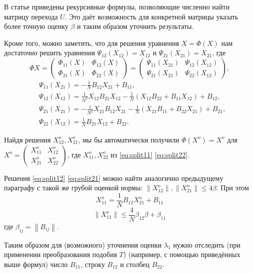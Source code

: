 В статье приведены рекурсивные формулы, позволяющие численно найти матрицу перехода \( U \).
Это даёт возможность для конкретной матрицы указать более точную оценку \( \beta \) и таким образом уточнить результаты.

Кроме того, можно заметить, что для решения уравнения \( X = \Phi(X) \)
нам достаточно решить уравнения \( \Psi_{12}(X_{12}) = X_{12} \) и \( \Psi_{21}(X_{21}) = X_{21} \),
где
\[
    \Phi X =
    \begin{pmatrix}
        \Phi_{11}(X) & \Phi_{12}(X) \\
        \Phi_{21}(X) & \Phi_{22}(X)
    \end{pmatrix} =
    \begin{pmatrix}
        \Psi_{11}(X_{21}) & \Psi_{12}(X_{12}) \\
        \Psi_{21}(X_{21}) & \Psi_{22}(X_{12})
    \end{pmatrix},
\]
\begin{subequations}
    \begin{align}
        \label{eq:split11}
        & \Psi_{11}(X_{21}) = -\frac1N B_{12}X_{21} + B_{11}, \\
        \label{eq:split12}
        & \Psi_{12}(X_{12}) = \frac{1}{N^2} X_{12}B_{21}X_{12} -
                                   \frac1N\left(X_{12}B_{22} +
                                   B_{11}X_{12}\right) + B_{12}, \\
        \label{eq:split21}
        & \Psi_{21}(X_{21}) = -\frac{1}{N^2} X_{21}B_{12}X_{21} -
                                   \frac1N\left(X_{21}B_{11} +
                                   B_{22}X_{21}\right) +
                                   B_{21}, \\
        \label{eq:split22}
        & \Psi_{22}(X_{12}) = \frac1N B_{21}X_{12} + B_{22}.
    \end{align}
\end{subequations}

Найдя решения \( X_{12}^o, X_{21}^o \),
мы бы автоматически получили
\( \Phi(X^o) = X^o \) для
\( X^o =
\left(\begin{smallmatrix}
    X_{11}^o & X_{12}^o \\
    X_{21}^o & X_{22}^o
\end{smallmatrix}\right) \),
где \( X_{11}^o, X_{22}^o \) из \eqref{eq:split11} \eqref{eq:split22}.

Решения \eqref{eq:split12} \eqref{eq:split21} можно найти аналогично предыдущему параграфу
с такой же грубой оценкой нормы: \( {\left\|X_{12}^o\right\|}, {\left\|X_{21}^o\right\|} \leq 4\beta \).
При этом
\[ X_{11}^o = \frac1N B_{12} X_{21}^o + B_{11} \]
\[ {\left\|X_{11}^o\right\|} \leq \frac4N \beta_{12}\beta + \beta_{11} \]
где \( \beta_{ij} = {\left\|B_{ij}\right\|} \).

Таким образом для (возможного) уточнения оценки \( \lambda_1 \)
нужно отследить (при применении преобразования подобия \( T \)) (например, с помощью приведённых выше формул)
число \( B_{11} \), строку \( B_{12} \) и столбец \( B_{22} \).
